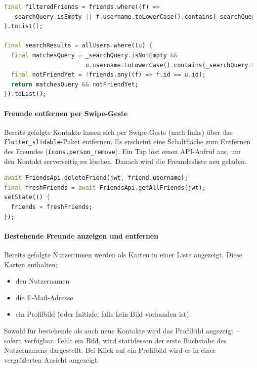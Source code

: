 \documentclass[11pt,a4paper]{article}
\begin{document}
\begin{lstlisting}[language=Dart, caption=Filter-Logik für Freundesliste und Suchergebnisse]
final filteredFriends = friends.where((f) =>
  _searchQuery.isEmpty || f.username.toLowerCase().contains(_searchQuery.toLowerCase())
).toList();

final searchResults = allUsers.where((u) {
  final matchesQuery = _searchQuery.isNotEmpty &&
                       u.username.toLowerCase().contains(_searchQuery.toLowerCase());
  final notFriendYet = !friends.any((f) => f.id == u.id);
  return matchesQuery && notFriendYet;
}).toList();
\end{lstlisting}

\paragraph{Freunde entfernen per Swipe-Geste}
Bereits gefolgte Kontakte lassen sich per Swipe-Geste (nach links) über das \texttt{flutter\_slidable}-Paket entfernen. Es erscheint eine Schaltfläche zum Entfernen des Freundes (\texttt{Icons.person\_remove}). Ein Tap löst einen API-Aufruf aus, um den Kontakt serverseitig zu löschen. Danach wird die Freundesliste neu geladen.



\begin{lstlisting}[language=Dart, caption=Unfollow eines Freundes per Slidable]
await FriendsApi.deleteFriend(jwt, friend.username);
final freshFriends = await FriendsApi.getAllFriends(jwt);
setState(() {
  friends = freshFriends;
});
\end{lstlisting}

\paragraph{Bestehende Freunde anzeigen und entfernen}
Bereits gefolgte Nutzer:innen werden als Karten in einer Liste angezeigt. Diese Karten enthalten:
\begin{itemize}
    \item den Nutzernamen
    \item die E-Mail-Adresse
    \item ein Profilbild (oder Initiale, falls kein Bild vorhanden ist)
\end{itemize}
Sowohl für bestehende als auch neue Kontakte wird das Profilbild angezeigt – sofern verfügbar. Fehlt ein Bild, wird stattdessen der erste Buchstabe des Nutzernamens dargestellt. Bei Klick auf ein Profilbild wird es in einer vergrößerten Ansicht angezeigt.
\end{document}
